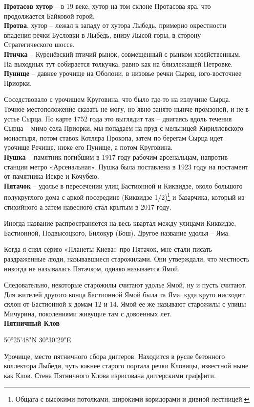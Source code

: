 \textbf{Протасов хутор} – в 19 веке, хутор на том склоне Протасова яра, что продолжается Байковой горой.\\

\textbf{Протва}, хутор – лежал к западу от хутора Лыбедь, примерно окрестности впадения речки Бусловки в Лыбедь, внизу Лысой горы, в сторону Стратегического шоссе.\\ 

\textbf{Птичка} – Куренёвский птичий рынок, совмещенный с рынком хозяйственным. На выходных тут собирается толкучка, равно как на близлежащей Петровке.\\

\textbf{Пунище} – давнее урочище на Оболони, в низовье речки Сырец, юго-восточнее Приорки.

Соседствовало с урочищем Круговина, что было где-то на излучине Сырца. Точное местоположение сказать не могу, но явно занято нынче промзоной, и не в устье Сырца. По карте 1752 года это выглядит так – двигаясь вдоль течения Сырца – мимо села Приорки, мы попадаем на пруд с мельницей Кирилловского монастыря, потом ставок Котляра Прокопа, затем по берегам Сырца идет урочище Речище, ниже его Пунище, а потом Круговина.\\

\textbf{Пушка} – памятник погибшим в 1917 году рабочим-арсенальцам, напротив станции метро «Арсенальная». Пушка была поставлена в 1923 году на постамент от памятника Искре и Кочубею.\\

\textbf{Пятачок} – удолье в пересечении улиц Бастионной и Киквидзе, около большого полукруглого дома с аркой посередине (Киквидзе 1/2)\footnote{Общага с высокими потолками,  широкими коридорами и дивной лестницей.} и базарчика, который из стихийного а затем навесного стал крытым в 2017 году.

Иногда название распространяется на весь квартал между улицами Киквидзе, Бастионной, Подвысоцкого, Билокур (Бош). Другое название удолья – Яма.

Когда я снял серию «Планеты Киева» про Пятачок, мне стали писать раздраженные люди, называвшиеся старожилами. Они утверждали, что местность никогда не называлась Пятачком, однако называется Ямой. 

Следовательно, некоторые старожилы считают удолье Ямой, ну и пусть считают. Для жителей другого конца Бастионной Ямой была та Яма, куда круто нисходит склон от Бастионной к домам 12 и 14. Ямой ее же называют старожилы с улицы Мичурина, поколениями живущие там с довоенных лет.\\

\textbf{Пятничный Клов}

50°25'48"N 30°30'29"E

Урочище, место пятничного сбора диггеров. Находится в русле бетонного коллектора Лыбеди, чуть южнее старого портала речки Кловицы, известной ныне как Клов. Стена Пятничного Клова изрисована диггерскими граффити.
